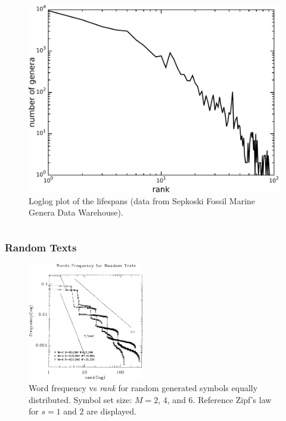 \documentclass[notes]{beamer}
\begin{document}
{\begin{columns}[c]
    \begin{figure}[h!]
    \centering
    \includegraphics[width=\textwidth]{imagespresentation/num_genera_loglog.pdf}
    \caption{Loglog plot of the lifespans (data from Sepkoski Fossil Marine Genera Data Warehouse).}
    \label{fig:num_genera_loglog}
    \end{figure}
 
  \end{columns}
}






\frame
{
  \frametitle{Random Texts}
    \begin{figure}[h!]
    \centering
    \includegraphics[width=0.45\textwidth]{imagespresentation/wentianli.png}
    \caption{Word frequency vs \emph{rank} for random generated symbols equally distributed. 
    Symbol set size: $M=2$, $4$, and $6$. Reference Zipf's law for $s=1$ and $2$ are displayed. \citep{li1992,miller1957}}
    \label{fig:wentianli}
    \end{figure}
}
\end{document}
